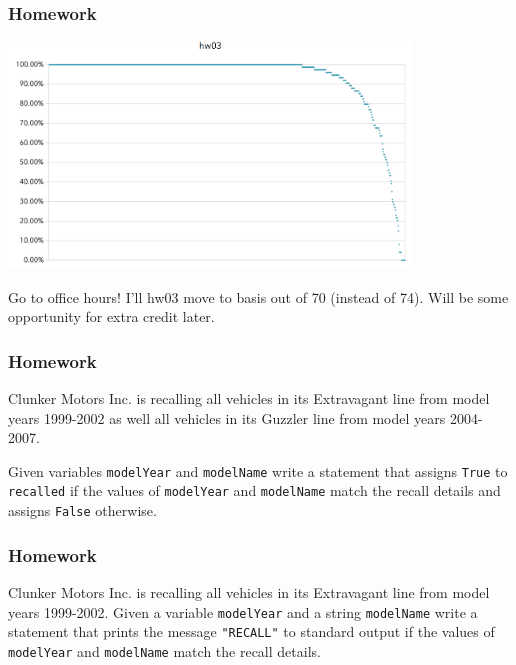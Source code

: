 \documentclass[11pt]{beamer}
\begin{document}
\begin{frame}[fragile]
  \frametitle{Homework}
  \Enlarge

  \includegraphics[width=0.8\textwidth]{./img/hw03-grades.png} %
  \begin{enumerate}
  \myitem  Go to office hours! %
  \myitem  I'll hw03 move to basis out of 70 (instead of 74). %
  \myitem  Will be some opportunity for extra credit later.
  \end{enumerate}
\end{frame}

\begin{frame}[fragile]
  \frametitle{Homework}
  \Enlarge

  Clunker Motors Inc. is recalling all vehicles in its Extravagant line from model years 1999-2002 as well all vehicles in its Guzzler line from model years 2004-2007.

  Given variables \texttt{modelYear} and \texttt{modelName} write a statement that assigns \texttt{True} to \texttt{recalled} if the values of \texttt{modelYear} and \texttt{modelName} match the recall details and assigns \texttt{False} otherwise.
\end{frame}

\begin{frame}[fragile]
  \frametitle{Homework}
  \Enlarge

  Clunker Motors Inc. is recalling all vehicles in its Extravagant line from model years 1999-2002. Given a variable \texttt{modelYear} and a string \texttt{modelName} write a statement that prints the message \texttt{"RECALL"} to standard output if the values of \texttt{modelYear} and \texttt{modelName} match the recall details.
\end{frame}
\end{document}
